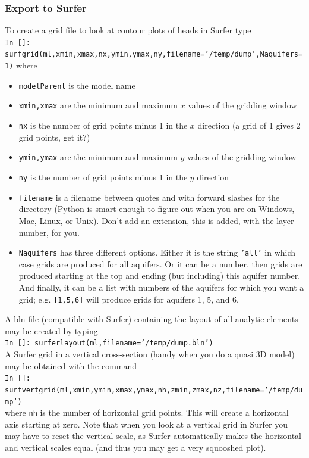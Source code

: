 \documentclass [10pt,letterpaper] {article}
\begin{document}
\subsubsection{Export to Surfer}
To create a grid file to look at contour plots of heads in
Surfer type
\\ {\tt In []:
surfgrid(ml,xmin,xmax,nx,ymin,ymax,ny,filename='/temp/dump',Naquifers=1)} where
\begin{itemize}
    \item {\tt modelParent} is the model name
    \item {\tt xmin,xmax} are the minimum and maximum $x$ values of the gridding window
    \item {\tt nx} is the number of grid points minus 1 in the $x$ direction (a grid of 1 gives 2 grid points, get it?)
    \item {\tt ymin,ymax} are the minimum and maximum $y$ values of the gridding window
    \item {\tt ny} is the number of grid points minus 1 in the $y$ direction
    \item {\tt filename} is a filename between quotes and with forward slashes for the
    directory (Python is smart enough to figure out when you are on Windows, Mac, Linux, or Unix).
    Don't add an extension, this is added, with the layer number, for you.
    \item {\tt Naquifers} has three different options. Either it is the string {\tt 'all'}
    in which case grids are produced for all aquifers. Or it can be a number, then grids are produced
    starting at the top and ending (but including) this aquifer number. And finally, it can be
    a list with numbers of the aquifers for which you want a grid; e.g. {\tt [1,5,6]} will produce
    grids for aquifers 1, 5, and 6.
\end{itemize}
A bln file
(compatible with Surfer) containing the layout of all analytic
elements may be created by typing
\\ {\tt In []: surferlayout(ml,filename='/temp/dump.bln')}
\\A Surfer grid in a vertical cross-section (handy when you do a quasi 3D model) may be obtained with the command
\\ {\tt In []: surfvertgrid(ml,xmin,ymin,xmax,ymax,nh,zmin,zmax,nz,filename='/temp/dump')}
\\where
{\tt nh} is the number of horizontal grid points. This will create a horizontal axis starting
at zero. Note that when you look at a vertical grid in Surfer you may have to reset the vertical scale, as
Surfer automatically makes the horizontal and vertical scales equal (and thus you may get
a very squooshed plot).
\end{document}
